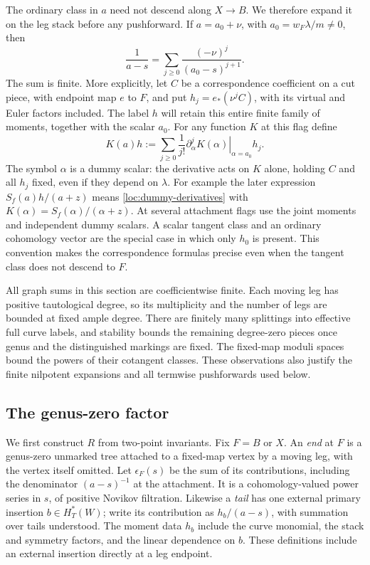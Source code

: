The ordinary class in $a$ need not descend along $X\to B$.
We therefore expand it on the leg stack before any pushforward. If
$a=a_0+\nu$, with $a_0=w_F\lambda/m\ne0$, then
\begin{equation}\label{loc:nilpotent-denominator}
 \frac1{a-s}=\sum_{j\geq0}\frac{(-\nu)^j}{(a_0-s)^{j+1}}.
\end{equation}
The sum is finite. More explicitly, let $C$ be a correspondence
coefficient on a cut piece, with endpoint map $e$ to $F$, and put
$h_j=e_*(\nu^jC)$, with its virtual and Euler factors included.
The label $h$ will retain this entire finite family of moments, together
with the scalar $a_0$. For any function $K$ at this flag define
\begin{equation}\label{loc:dummy-derivatives}
       K(a)h:=\sum_{j\geq0}\frac1{j!}
          \left.\partial_\alpha^jK(\alpha)\right|_{\alpha=a_0}h_j.
\end{equation}
The symbol $\alpha$ is a dummy scalar: the derivative acts on $K$
alone, holding $C$ and all $h_j$ fixed, even if they depend on
$\lambda$. For example the later expression
$S_f(a)h/(a+z)$ means \eqref{loc:dummy-derivatives} with
$K(\alpha)=S_f(\alpha)/(\alpha+z)$. At several attachment flags use
the joint moments and independent dummy scalars. A scalar tangent
class and an ordinary cohomology vector are the special case in which
only $h_0$ is present. This convention makes the
correspondence formulas precise even when the tangent class does
not descend to $F$.

All graph sums in this section are coefficientwise finite. Each moving
leg has positive tautological degree, so its multiplicity and the number
of legs are bounded at fixed ample degree. There are finitely many
splittings into effective full curve labels, and stability bounds the
remaining degree-zero pieces once genus and the distinguished markings
are fixed. The fixed-map moduli spaces bound the powers of their
cotangent classes. These observations also justify the finite
nilpotent expansions and all termwise pushforwards used below.

\subsection{The genus-zero factor}

We first construct $R$ from two-point invariants. Fix $F=B$ or $X$.
An \emph{end} at $F$ is a genus-zero unmarked tree attached to a
fixed-map vertex by a moving leg, with the vertex itself omitted.
Let $\epsilon_F(s)$ be the sum of its contributions, including the
denominator $(a-s)^{-1}$ at the attachment. It is a cohomology-valued
power series in $s$, of positive Novikov filtration. Likewise a
\emph{tail} has one external primary insertion $b\in H_T^*(W)$;
write its contribution as $h_b/(a-s)$, with summation over tails
understood. The moment data $h_b$ include the curve monomial, the stack
and symmetry factors, and the linear dependence on $b$. These
definitions include an external insertion directly at a leg endpoint.

